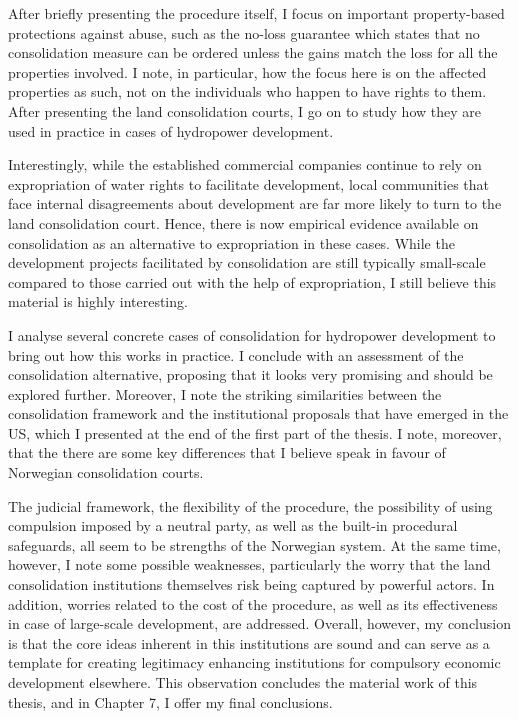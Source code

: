 \documentclass{book} %
\begin{document}
After briefly presenting the procedure itself, I focus on important property-based protections against abuse, such as the no-loss guarantee which states that no consolidation measure can be ordered unless the gains match the loss for all the properties involved. I note, in particular, how the focus here is on the affected properties as such, not on the individuals who happen to have rights to them. After presenting the land consolidation courts, I go on to study how they are used in practice in cases of hydropower development. 

Interestingly, while the established commercial companies continue to rely on expropriation of water rights to facilitate development, local communities that face internal disagreements about development are far more likely to turn to the land consolidation court. Hence, there is now empirical evidence available on consolidation as an alternative to expropriation in these cases. While the development projects facilitated by consolidation are still typically small-scale compared to those carried out with the help of expropriation, I still believe this material is highly interesting. 

I analyse several concrete cases of consolidation for hydropower development to bring out how this works in practice. I conclude with an assessment of the consolidation alternative, proposing that it looks very promising and should be explored further. Moreover, I note the striking similarities between the consolidation framework and the institutional proposals that have emerged in the US, which I presented at the end of the first part of the thesis. I note, moreover, that the there are some key differences that I believe speak in favour of Norwegian consolidation courts. 

The judicial framework, the flexibility of the procedure, the possibility of using compulsion imposed by a neutral party, as well as the built-in procedural safeguards, all seem to be strengths of the Norwegian system. At the same time, however, I note some possible weaknesses, particularly the worry that the land consolidation institutions themselves risk being captured by powerful actors. In addition, worries related to the cost of the procedure, as well as its effectiveness in case of large-scale development, are addressed. Overall, however, my conclusion is that the core ideas inherent in this institutions are sound and can serve as a template for creating legitimacy enhancing institutions for compulsory economic development elsewhere. This observation concludes the material work of this thesis, and in Chapter 7, I offer my final conclusions.
\end{document}
